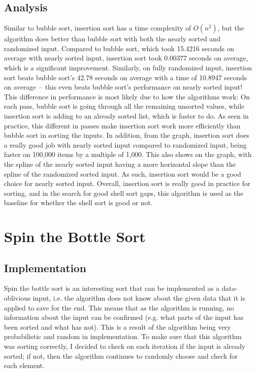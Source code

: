 \documentclass{article}
\begin{document}
\subsection{Analysis}
    Similar to bubble sort, insertion sort has a time complexity of $O(n^2)$,
    but the algorithm does better than bubble sort with both the nearly sorted
    and randomized input. Compared to bubble sort, which took 15.4216 seconds
    on average with nearly sorted input, insertion sort took 0.00377 seconds on
    average, which is a significant improvement. Similarly, on fully randomized
    input, insertion sort beats bubble sort's 42.78 seconds on average with a
    time of 10.8947 seconds on average – this even beats bubble sort's
    performance on nearly sorted input! 
    \nextblurb 
    This difference in performance is most likely due to how the algorithms
    work: On each pass, bubble sort is going through all the remaining unsorted
    values, while insertion sort is adding to an already sorted list, which is 
    faster to do. As seen in practice, this different in passes make insertion
    sort work more efficiently than bubble sort in sorting the inputs.
    \nextblurb 
    In addition, from the graph, insertion sort does a really good job with
    nearly sorted input compared to randomized input, being faster on 100,000
    items by a multiple of 1,000. This also shows on the graph, with the spline
    of the nearly sorted input having a more horizontal slope than the spline
    of the randomized sorted input. As such, insertion sort would be a good
    choice for nearly sorted input.
    \nextblurb 
    Overall, insertion sort is really good in practice for sorting, and in the
    search for good shell sort gaps, this algorithm is used as the baseline for
    whether the shell sort is good or not.

\section{Spin the Bottle Sort}
\subsection{Implementation}
    Spin the bottle sort is an interesting sort that can be implemented as a
    data-oblivious input, i.e. the algorithm does not know about the given data
    that it is applied to save for the end. This means that as the algorithm is  
    running, no information about the input can be confirmed (e.g. what parts of
    the input has been sorted and what has not). This is a result of the
    algorithm being very probabilistic and random in implementation.
    \nextblurb
    To make sure that this algorithm was sorting correctly, I decided to check
    on each iteration if the input is already sorted; if not, then the algorithm
    continues to randomly choose and check for each element.
\end{document}

